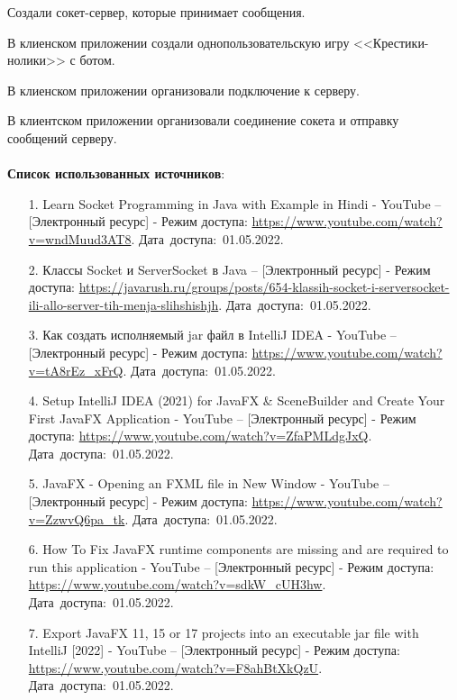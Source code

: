 \documentclass[12pt, a4paper, simple]{eskdtext}
\begin{document}
    Создали сокет-сервер, которые принимает сообщения.

    В клиенском приложении создали однопользовательскую игру <<Крестики-нолики>> с ботом.

    В клиенском приложении организовали подключение к серверу.

    В клиентском приложении организовали соединение сокета и отправку сообщений серверу.
    
    \newpage
    \paragraph{} \textbf{Список использованных источников}:
    \begin{enumerate}
        \item[1.] Learn Socket Programming in Java with Example in Hindi - YouTube -- [Электронный ресурс]
        - Режим доступа: \url{https://www.youtube.com/watch?v=wndMuud3AT8}.
        Дата~доступа:~01.05.2022.
        \item[2.] Классы Socket и ServerSocket в Java -- [Электронный ресурс]
        - Режим доступа: \url{https://javarush.ru/groups/posts/654-klassih-socket-i-serversocket-ili-allo-server-tih-menja-slihshishjh}.
        Дата~доступа:~01.05.2022.
        \item[3.] Как создать исполняемый jar файл в IntelliJ IDEA - YouTube -- [Электронный ресурс]
        - Режим доступа: \url{https://www.youtube.com/watch?v=tA8rEz_xFrQ}.
        Дата~доступа:~01.05.2022.
        \item[4.] Setup IntelliJ IDEA (2021) for JavaFX \& SceneBuilder and Create Your First JavaFX Application - YouTube -- [Электронный ресурс]
        - Режим доступа: \url{https://www.youtube.com/watch?v=ZfaPMLdgJxQ}.
        Дата~доступа:~01.05.2022.
        \item[5.] JavaFX - Opening an FXML file in New Window - YouTube -- [Электронный ресурс]
        - Режим доступа: \url{https://www.youtube.com/watch?v=ZzwvQ6pa_tk}.
        Дата~доступа:~01.05.2022.
        \item[6.] How To Fix JavaFX runtime components are missing and are required to run this application - YouTube -- [Электронный ресурс]
        - Режим доступа: \url{https://www.youtube.com/watch?v=sdkW_cUH3hw}.
        Дата~доступа:~01.05.2022.
        \item[7.] Export JavaFX 11, 15 or 17 projects into an executable jar file with IntelliJ [2022] - YouTube -- [Электронный ресурс]
        - Режим доступа: \url{https://www.youtube.com/watch?v=F8ahBtXkQzU}.
        Дата~доступа:~01.05.2022.
    \end{enumerate}
    \newpage
\end{document}
